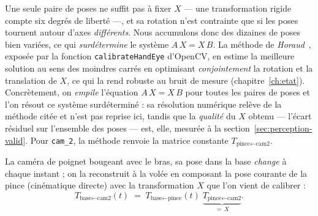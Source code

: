 Une seule paire de poses ne suffit pas à fixer $X$ --- une transformation rigide compte six degrés de liberté ---, et sa rotation n'est contrainte que si les poses tournent autour d'axes \emph{différents}. Nous accumulons donc des dizaines de poses bien variées, ce qui \emph{surdétermine} le système $A\,X = X\,B$. La méthode de \emph{Horaud}~\cite{horaud_hand-eye_1995}, exposée par la fonction \texttt{calibrateHandEye} d'OpenCV, en estime la meilleure solution au sens des moindres carrés en optimisant \emph{conjointement} la rotation et la translation de $X$, ce qui la rend robuste au bruit de mesure (chapitre~\ref{ch:etat}). Concrètement, on \emph{empile} l'équation $A\,X = X\,B$ pour toutes les paires de poses et l'on résout ce système surdéterminé : sa résolution numérique relève de la méthode citée et n'est pas reprise ici, tandis que la \emph{qualité} du $X$ obtenu --- l'écart résiduel sur l'ensemble des poses --- est, elle, mesurée à la section~\ref{sec:perception-valid}. Pour \texttt{cam\_2}, la méthode renvoie la matrice constante $T_{\text{pince}\leftarrow\text{cam2}}$.

La caméra de poignet bougeant avec le bras, sa pose dans la base \emph{change} à chaque instant ; on la reconstruit à la volée en composant la pose courante de la pince (cinématique directe) avec la transformation $X$ que l'on vient de calibrer :
\[
  T_{\text{base}\leftarrow\text{cam2}}(t) \;=\; T_{\text{base}\leftarrow\text{pince}}(t)\; \underbrace{T_{\text{pince}\leftarrow\text{cam2}}}_{=\,X} .
\]

